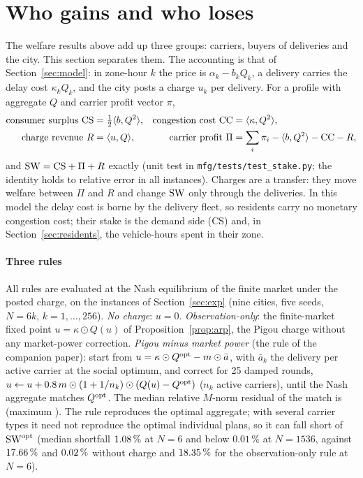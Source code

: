 \section{Who gains and who loses}\label{sec:stake}
\newcommand{\pc}[1]{$#1\,\%$}

The welfare results above add up three groups: carriers, buyers of deliveries and the city. This section separates them. The accounting is that of Section~\ref{sec:model}: in zone-hour $k$ the price is $\alpha_k-b_kQ_k$, a delivery carries the delay cost $\kappa_kQ_k$, and the city posts a charge $u_k$ per delivery. For a profile with aggregate $Q$ and carrier profit vector $\pi$,
\begin{align*}
\text{consumer surplus } \mathrm{CS}&=\tfrac12\langle b,Q^2\rangle, & \text{congestion cost } \mathrm{CC}&=\langle \kappa,Q^2\rangle,\\
\text{charge revenue } R&=\langle u,Q\rangle, & \text{carrier profit } \Pi&=\sum_i\pi_i-\langle b,Q^2\rangle-\mathrm{CC}-R,
\end{align*}
and $\mathrm{SW}=\mathrm{CS}+\Pi+R$ exactly (unit test in \texttt{mfg/tests/test\_stake.py}; the identity holds to \StakeIdErr{} relative error in all \StakeRows{} instances). Charges are a transfer: they move welfare between $\Pi$ and $R$ and change $\mathrm{SW}$ only through the deliveries. In this model the delay cost is borne by the delivery fleet, so residents carry no monetary congestion cost; their stake is the demand side (CS) and, in Section~\ref{sec:residents}, the vehicle-hours spent in their zone.

\paragraph{Three rules} All rules are evaluated at the Nash equilibrium of the finite market under the posted charge, on the instances of Section~\ref{sec:exp} (nine cities, five seeds, $N=6k$, $k=1,\dots,256$). \emph{No charge}: $u=0$. \emph{Observation-only}: the finite-market fixed point $u=\kappa\odot Q(u)$ of Proposition~\ref{prop:arp}, the Pigou charge without any market-power correction. \emph{Pigou minus market power} (the rule of the companion paper): start from $u=\kappa\odot Q^{\mathrm{opt}}-m\odot\bar a$, with $\bar a_k$ the delivery per active carrier at the social optimum, and correct for 25 damped rounds, $u\leftarrow u+0.8\,m\odot(1+1/n_k)\odot(Q(u)-Q^{\mathrm{opt}})$ ($n_k$ active carriers), until the Nash aggregate matches $Q^{\mathrm{opt}}$. The median relative $M$-norm residual of the match is \PmResidMed{} (maximum \PmResidMax). The rule reproduces the optimal aggregate; with several carrier types it need not reproduce the optimal individual plans, so it can fall short of $\mathrm{SW}^{\mathrm{opt}}$ (median shortfall \pc{\PmLossSix} at $N=6$ and below $0.01\,\%$ at $N=1536$, against \pc{\NoLossSix} and \pc{\NoLossBig} without charge and \pc{\ObsLossSix} for the observation-only rule at $N=6$).


